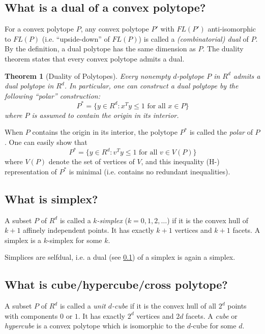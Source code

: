 \documentclass[[a4paper,12pt]{article}
\newtheorem{theorem}{Theorem}
\begin{document}
\subsection{What is a dual of a convex polytope?} \label{polytope:dual}

For a convex polytope $P$, any convex polytope $P'$ with $FL(P')$
anti-isomorphic to $FL(P)$ (i.e. ``upside-down'' of $FL(P)$)
is called a {\em (combinatorial) dual\/} of $P$.  By the definition,
a dual polytope has the same dimension as $P$. The duality theorem
states that every convex polytope admits a dual.

\begin{theorem} [Duality of Polytopes] \label{thm:polydual}
Every nonempty $d$-polytope $P$ in $R^d$ 
admits a dual polytope in $R^d$.  In particular,
one can construct a dual polytope by the following ``polar'' construction:
\[
  P^* = \{y \in R^d:  x^T y \le 1 \text{ for all } x \in P \}
\]
where $P$ is assumed to contain the origin in its interior.
\end{theorem}

When $P$ contains the origin in its interior,
the polytope $P^*$ is called the {\em polar\/} of $P$.   One can
easily show that
\[
  P^* = \{y \in R^d:  v^T y \le 1 \text{ for all } v \in  V(P) \}
\]
where $V(P)$ denote the set of vertices of $V$, and this inequality
(H-) representation of $P^*$ is minimal (i.e. contains 
no redundant inequalities).

\subsection{What is simplex?} \label{polytope:simplex}

A subset $P$ of $R^d$ is called a {\em $k$-simplex\/} ($k =0,1, 2, \ldots$)
if it is the convex hull of $k+1$ affinely independent points. It has
exactly $k+1$ vertices and $k+1$ facets.   A simplex is
a $k$-simplex for some $k$.

Simplices are selfdual, i.e. a dual (see \ref{polytope:dual}) of a simplex is again a simplex.

\subsection{What is cube/hypercube/cross polytope?} \label{polytope:hypercube}

A subset $P$ of $R^d$ is called a {\em unit $d$-cube\/} if it is
the convex hull of all $2^d$ points with components $0$ or $1$.   It has
exactly $2^d$ vertices and $2 d$ facets.  A {\em cube\/} or 
{\em hypercube\/} is a 
convex polytope which is isomorphic to the $d$-cube for some
$d$.
\end{document}
